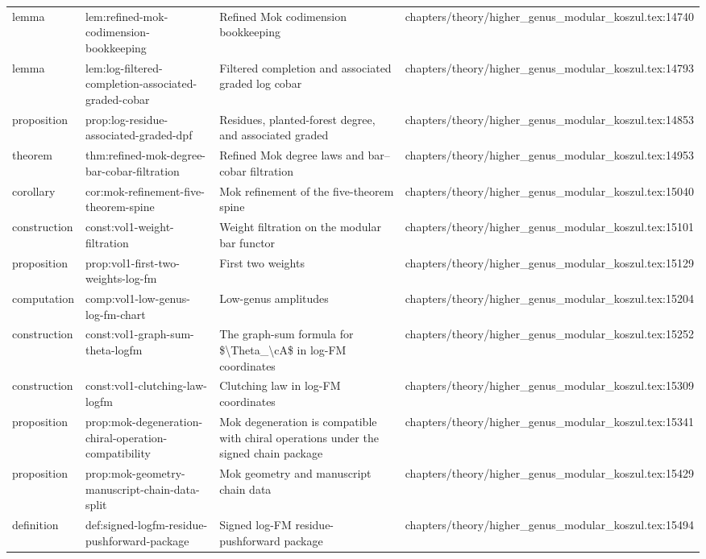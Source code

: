 \documentclass[11pt]{article}
\begin{document}
\begin{longtable}{L{0.10\textwidth}L{0.26\textwidth}L{0.42\textwidth}L{0.22\textwidth}}
lemma & lem:refined-mok-codimension-bookkeeping & Refined Mok codimension bookkeeping & chapters/theory/higher\_genus\_modular\_koszul.tex:14740\\
lemma & lem:log-filtered-completion-associated-graded-cobar & Filtered completion and associated graded log cobar & chapters/theory/higher\_genus\_modular\_koszul.tex:14793\\
proposition & prop:log-residue-associated-graded-dpf & Residues, planted-forest degree, and associated graded & chapters/theory/higher\_genus\_modular\_koszul.tex:14853\\
theorem & thm:refined-mok-degree-bar-cobar-filtration & Refined Mok degree laws and bar--cobar filtration & chapters/theory/higher\_genus\_modular\_koszul.tex:14953\\
corollary & cor:mok-refinement-five-theorem-spine & Mok refinement of the five-theorem spine & chapters/theory/higher\_genus\_modular\_koszul.tex:15040\\
construction & const:vol1-weight-filtration & Weight filtration on the modular bar functor & chapters/theory/higher\_genus\_modular\_koszul.tex:15101\\
proposition & prop:vol1-first-two-weights-log-fm & First two weights & chapters/theory/higher\_genus\_modular\_koszul.tex:15129\\
computation & comp:vol1-low-genus-log-fm-chart & Low-genus amplitudes & chapters/theory/higher\_genus\_modular\_koszul.tex:15204\\
construction & const:vol1-graph-sum-theta-logfm & The graph-sum formula for \$\textbackslash{}Theta\_\textbackslash{}cA\$ in log-FM coordinates & chapters/theory/higher\_genus\_modular\_koszul.tex:15252\\
construction & const:vol1-clutching-law-logfm & Clutching law in log-FM coordinates & chapters/theory/higher\_genus\_modular\_koszul.tex:15309\\
proposition & prop:mok-degeneration-chiral-operation-compatibility & Mok degeneration is compatible with chiral operations under the signed chain package & chapters/theory/higher\_genus\_modular\_koszul.tex:15341\\
proposition & prop:mok-geometry-manuscript-chain-data-split & Mok geometry and manuscript chain data & chapters/theory/higher\_genus\_modular\_koszul.tex:15429\\
definition & def:signed-logfm-residue-pushforward-package & Signed log-FM residue-pushforward package & chapters/theory/higher\_genus\_modular\_koszul.tex:15494\\

\end{longtable}
\end{document}
